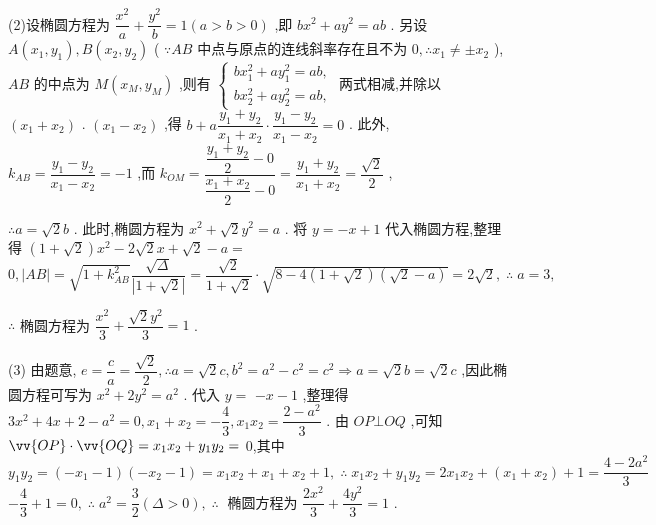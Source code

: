 (2)设椭圆方程为 $\dfrac{{x}^{2}}{a} + \dfrac{{y}^{2}}{b} = 1\left( {a > b > 0}\right)$ ,即 $b{x}^{2} + a{y}^{2} = {ab}$ . 另设 $A\left( {{x}_{1},{y}_{1}}\right) ,B\left( {{x}_{2},{y}_{2}}\right)$ ( $\because {AB}$ 中点与原点的连线斜率存在且不为 $0,\therefore {x}_{1} \neq   \pm  {x}_{2}$ ), ${AB}$ 的中点为 $M\left( {{x}_{M},{y}_{M}}\right)$ ,则有 $\left\{  \begin{array}{l} b{x}_{1}^{2} + a{y}_{1}^{2} = {ab}, \\  b{x}_{2}^{2} + a{y}_{2}^{2} = {ab}, \end{array}\right.$ 两式相减,并除以 $\left( {{x}_{1} + {x}_{2}}\right)$ . $\left( {{x}_{1} - {x}_{2}}\right)$ ,得 $b + a\dfrac{{y}_{1} + {y}_{2}}{{x}_{1} + {x}_{2}} \cdot  \dfrac{{y}_{1} - {y}_{2}}{{x}_{1} - {x}_{2}} = 0$ . 此外, ${k}_{AB} = \dfrac{{y}_{1} - {y}_{2}}{{x}_{1} - {x}_{2}} =  - 1$ ,而 ${k}_{OM} = \dfrac{\dfrac{{y}_{1} + {y}_{2}}{2} - 0}{\dfrac{{x}_{1} + {x}_{2}}{2} - 0} = \dfrac{{y}_{1} + {y}_{2}}{{x}_{1} + {x}_{2}} = \dfrac{\sqrt{2}}{2}$ ,

$\therefore a = \sqrt{2}b$ . 此时,椭圆方程为 ${x}^{2} + \sqrt{2}{y}^{2} = a$ . 将 $y =  - x + 1$ 代入椭圆方程,整理得 $\left( {1 + \sqrt{2}}\right) {x}^{2} - 2\sqrt{2}x + \sqrt{2} - a =$  $0,\left| {AB}\right|  = \sqrt{1 + {k}_{AB}^{2}}\dfrac{\sqrt{\Delta }}{\left| 1 + \sqrt{2}\right| } = \dfrac{\sqrt{2}}{1 + \sqrt{2}} \cdot  \sqrt{8 - 4\left( {1 + \sqrt{2}}\right) \left( {\sqrt{2} - a}\right) } = 2\sqrt{2},\;\therefore \;a = 3,$

$\therefore$ 椭圆方程为 $\dfrac{{x}^{2}}{3} + \dfrac{\sqrt{2}{y}^{2}}{3} = 1$ .

(3) 由题意, $e = \dfrac{c}{a} = \dfrac{\sqrt{2}}{2},\therefore a = \sqrt{2}c,{b}^{2} = {a}^{2} - {c}^{2} = {c}^{2} \Rightarrow  a = \sqrt{2}b = \sqrt{2}c$ ,因此椭圆方程可写为 ${x}^{2} + 2{y}^{2} = {a}^{2}$ . 代入 $y =$  $- x - 1$ ,整理得 $3{x}^{2} + {4x} + 2 - {a}^{2} = 0,{x}_{1} + {x}_{2} =  - \dfrac{4}{3},{x}_{1}{x}_{2} = \dfrac{2 - {a}^{2}}{3}$ . 由 ${OP} \bot  {OQ}$ ,可知 $\vv{OP} \cdot  \vv{OQ} = {x}_{1}{x}_{2} + {y}_{1}{y}_{2} =$ 0,其中 ${y}_{1}{y}_{2} = \left( {-{x}_{1} - 1}\right) \left( {-{x}_{2} - 1}\right)  = {x}_{1}{x}_{2} + {x}_{1} + {x}_{2} + 1,\;\therefore \;{x}_{1}{x}_{2} + {y}_{1}{y}_{2} = 2{x}_{1}{x}_{2} + \left( {{x}_{1} + {x}_{2}}\right)  + 1 = \dfrac{4 - 2{a}^{2}}{3}$  $- \dfrac{4}{3} + 1 = 0,\;\therefore \;{a}^{2} = \dfrac{3}{2}\left( {\Delta  > 0}\right) ,\;\therefore \;$ 椭圆方程为 $\dfrac{2{x}^{2}}{3} + \dfrac{4{y}^{2}}{3} = 1$ .

